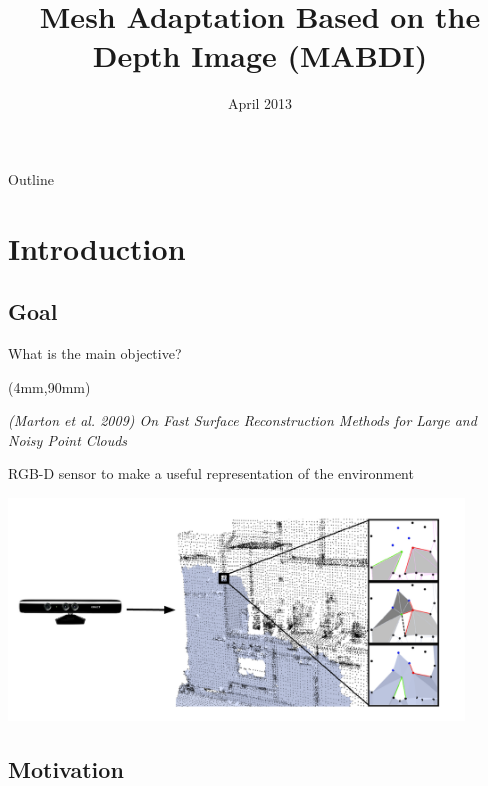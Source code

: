 \documentclass{beamer}
\title{Mesh Adaptation Based on the Depth Image (MABDI)}
\author{
{Lucas Chavez} \\ ~\\
{\small{Dr. Lumia\inst{1} \and Dr. Fierro\inst{1} \\ \and Dr. Chaimowicz\inst{2} \and
Dr. Campos\inst{2} \and Dr. Anderson\inst{3}}} 
}
\institute
{
  \inst{1}%
  University of New Mexico  \and
  \inst{2}%
  Universidade Federal de Minas Gerais \and
  \inst{3}%
  Sandia National Laboratories 
}
\date{April 2013}
\newenvironment{reference}[2]{%
  \begin{textblock*}{\textwidth}(#1,#2)

      \tiny\it\bgroup\color{red!50!black}}{\egroup\end{textblock*}}
\begin{document}
\begin{frame}[plain]
  \titlepage
\end{frame}

\begin{frame}{Outline}
  \tableofcontents
\end{frame}

\section{Introduction}

\subsection{Goal}

\begin{frame}{What is the main objective?}
\begin{reference}{4mm}{90mm}
(Marton et al. 2009) On Fast Surface Reconstruction Methods for Large and Noisy Point Clouds
\end{reference} 
  {\small RGB-D sensor to make a useful representation of the environment}
  \vspace{-.2in}
  \begin{center}
  \includegraphics[height=5.9cm]{MainGoal.pdf} 
  \end{center}
\end{frame}

\subsection{Motivation}
\end{document}
